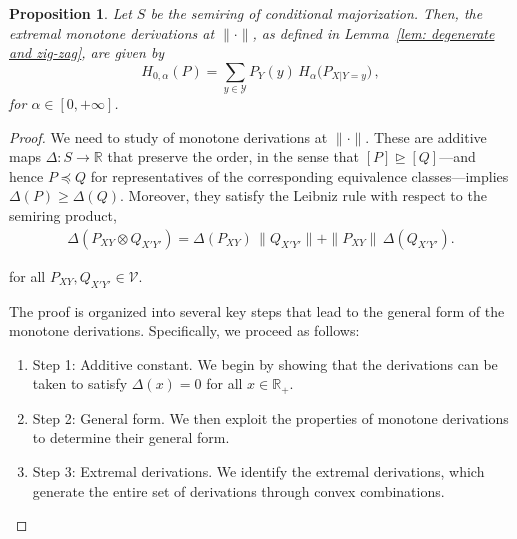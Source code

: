 \documentclass[aps,pra,11pt,onecolumn,nofootinbib,tightenlines]{revtex4-2}
\newtheorem{proposition}[theorem]{Proposition}
\theoremstyle{definition}
\newcommand{\V}{\mathcal{V}}
\newcommand{\rgeq}{\trianglerighteq}
\begin{document}
\begin{proposition}
\label{prop: monotone derivations}
Let \( S\) be the semiring of conditional majorization. Then, the extremal monotone derivations at \(\|\cdot\|\), as defined in Lemma~\ref{lem: degenerate and zig-zag}, are given by
\begin{equation}
\label{eq:ExtDerivation}
H_{0,\alpha}(P)
= \sum_{y \in \mathcal{Y}} P_Y(y) \, H_\alpha\!\big(P_{X|Y = y}\big)\,,
\end{equation}
for \(\alpha \in [0,+\infty]\).
\end{proposition}
\begin{proof}
We need to study of monotone derivations at $\|\cdot\|$. These are additive maps \(\Delta \colon S \to \mathbb{R}\) that preserve the order, in the sense that \([P] \rgeq [Q]\)—and hence \(P \preceq Q\) for representatives of the corresponding equivalence classes—implies \(\Delta(P) \geq \Delta(Q)\). Moreover, they satisfy the Leibniz rule with respect to the semiring product,
\begin{align}\label{eq:LeibnizRule}
\Delta(P_{XY}\otimes Q_{X'Y'}) 
= \Delta(P_{XY})\,\|Q_{X'Y'}\|
+ \|P_{XY}\|\,\Delta(Q_{X'Y'}) .
\end{align}

for all $P_{XY},Q_{X'Y'}\in\V$. 

The proof is organized into several key steps that lead to the general form of the monotone derivations. Specifically, we proceed as follows:
\begin{enumerate}
    \item Step 1: Additive constant. We begin by showing that the derivations can be taken to satisfy \(\Delta(x) = 0\) for all \(x \in \mathbb{R}_+\).
    \item Step 2: General form. We then exploit the properties of monotone derivations to determine their general form.
    \item Step 3: Extremal derivations. We identify the extremal derivations, which generate the entire set of derivations through convex combinations.
\end{enumerate}


\medskip


\end{proof}
\end{document}
